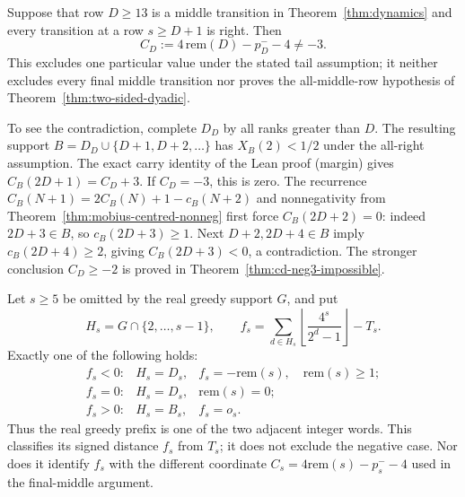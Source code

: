 \par
\noindent\begin{minipage}{\linewidth}
\begin{thm}
\label{thm:final-middle-cell}
Suppose that row $D\ge13$ is a middle transition in
Theorem~\ref{thm:dynamics} and every transition at a row $s\ge D+1$
is right.  Then
\[
 C_D:=4\,\mathrm{rem}(D)-p_D^--4\ne-3.
\]
This excludes one particular value under the stated tail assumption;
it neither excludes every final middle transition nor proves the
all-middle-row hypothesis of Theorem~\ref{thm:two-sided-dyadic}.
\end{thm}
\end{minipage}\par
To see the contradiction, complete $D_D$ by all ranks greater than $D$.
The resulting support $B=D_D\cup\{D+1,D+2,\ldots\}$ has
$X_B(2)<1/2$ under the all-right assumption.  The exact carry identity
of the Lean proof (margin) gives $C_B(2D+1)=C_D+3$.  If $C_D=-3$, this is zero.
The recurrence
$C_B(N+1)=2C_B(N)+1-c_B(N+2)$ and nonnegativity from
Theorem~\ref{thm:mobius-centred-nonneg} first force $C_B(2D+2)=0$:
indeed $2D+3\in B$, so $c_B(2D+3)\ge1$.
Next $D+2,2D+4\in B$ imply $c_B(2D+4)\ge2$, giving
$C_B(2D+3)<0$, a contradiction.  The stronger conclusion
$C_D\ge-2$ is proved in Theorem~\ref{thm:cd-neg3-impossible}.


\begin{lem}
\label{lem:skipped-endpoint-trichotomy}
Let $s\ge5$ be omitted by the real greedy support $G$, and put
\[
 H_s=G\cap\{2,\ldots,s-1\},\qquad
 f_s=\sum_{d\in H_s}\left\lfloor\frac{4^s}{2^d-1}\right\rfloor-T_s.
\]
Exactly one of the following holds:
\[
 \begin{array}{lll}
 f_s<0:& H_s=D_s,& f_s=-\mathrm{rem}(s),\quad \mathrm{rem}(s)\ge1;\\
 f_s=0:& H_s=D_s,& \mathrm{rem}(s)=0;\\
 f_s>0:& H_s=B_s,& f_s=o_s.
 \end{array}
\]
Thus the real greedy prefix is one of the two adjacent integer words.
This classifies its signed distance $f_s$ from $T_s$; it does not
exclude the negative case.  Nor does it identify $f_s$ with the
different coordinate $C_s=4\mathrm{rem}(s)-p_s^- -4$ used in the
final-middle argument.
\end{lem}

